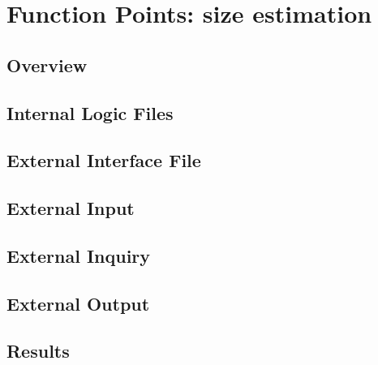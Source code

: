 \section{Function Points: size estimation}
\subsection{Overview} %
\label{sub:fp_overview}

\subsection{Internal Logic Files} %
\label{sub:ilf}

\subsection{External Interface File} %
\label{sub:elf}

\subsection{External Input} %
\label{sub:ei}

\subsection{External Inquiry} %
\label{sub:eiq}

\subsection{External Output} %
\label{sub:eo}

\subsection{Results} %
\label{sub:results}
